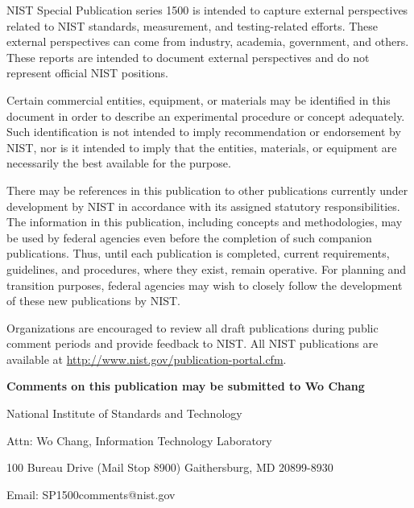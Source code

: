 \documentclass[11pt]{article}
\begin{document}
NIST Special Publication series 1500 is intended to capture external perspectives related to NIST 
standards, measurement, and testing-related efforts. These external perspectives can come from 
industry, academia, government, and others. These reports are intended to document external 
perspectives and do not represent official NIST positions.

\begin{mdframed}

Certain commercial entities, equipment, or materials may be identified in this document in order to describe an 
experimental procedure or concept adequately. Such identification is not intended to imply recommendation or 
endorsement by NIST, nor is it intended to imply that the entities, materials, or equipment are necessarily the best 
available for the purpose. 

There may be references in this publication to other publications currently under development by NIST in 
accordance with its assigned statutory responsibilities. The information in this publication, including concepts and 
methodologies, may be used by federal agencies even before the completion of such companion publications. Thus, 
until each publication is completed, current requirements, guidelines, and procedures, where they exist, remain 
operative. For planning and transition purposes, federal agencies may wish to closely follow the development of 
these new publications by NIST. 

Organizations are encouraged to review all draft publications during public comment periods and provide feedback 
to NIST. All NIST publications are available at \url{http://www.nist.gov/publication-portal.cfm}.

\end{mdframed}

\bigskip \bigskip \bigskip

\begin{center}
{\bf Comments on this publication may be submitted to Wo Chang}
\bigskip

National Institute of Standards and Technology

Attn: Wo Chang, Information Technology Laboratory

100 Bureau Drive (Mail Stop 8900) Gaithersburg, MD 20899-8930

Email: SP1500comments@nist.gov 
\end{center}

\newpage

\end{document}
